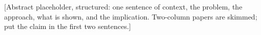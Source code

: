 \begin{summary}
[Abstract placeholder, structured: one sentence of context, the problem, the approach, what is shown, and the implication. Two-column papers are skimmed; put the claim in the first two sentences.]
\end{summary}
